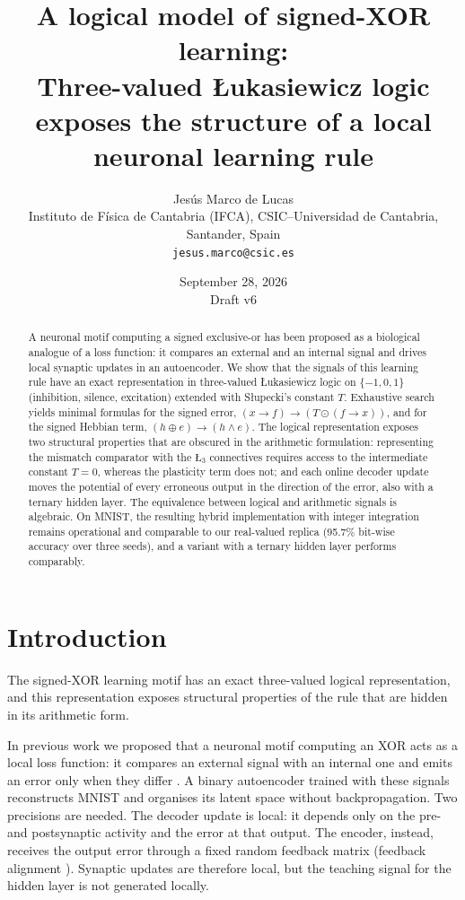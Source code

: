 \documentclass[11pt,a4paper]{article}
\title{A logical model of signed-XOR learning:\\[4pt]
\large Three-valued \L ukasiewicz logic exposes the structure of a local neuronal learning rule}
\author{Jes\'us Marco de Lucas\\[2pt]
\small Instituto de F\'isica de Cantabria (IFCA), CSIC--Universidad de Cantabria, Santander, Spain\\
\small \texttt{jesus.marco@csic.es}}
\date{September 28, 2026 \\ \small Draft v6}
\theoremstyle{remark}
\newcommand{\Lt}{\text{\L}_3}
\begin{document}
\maketitle

\begin{abstract}
A neuronal motif computing a signed exclusive-or has been proposed as a biological analogue of a loss function: it compares an external and an internal signal and drives local synaptic updates in an autoencoder. We show that the signals of this learning rule have an exact representation in three-valued \L ukasiewicz logic on $\{-1,0,1\}$ (inhibition, silence, excitation) extended with S\l upecki's constant $T$. Exhaustive search yields minimal formulas for the signed error, $(x\to f)\to(T\odot(f\to x))$, and for the signed Hebbian term, $(h\oplus e)\to(h\wedge e)$. The logical representation exposes two structural properties that are obscured in the arithmetic formulation: representing the mismatch comparator with the $\Lt$ connectives requires access to the intermediate constant $T=0$, whereas the plasticity term does not; and each online decoder update moves the potential of every erroneous output in the direction of the error, also with a ternary hidden layer. The equivalence between logical and arithmetic signals is algebraic. On MNIST, the resulting hybrid implementation with integer integration remains operational and comparable to our real-valued replica (95.7\% bit-wise accuracy over three seeds), and a variant with a ternary hidden layer performs comparably.
\end{abstract}

\section{Introduction}

The signed-XOR learning motif has an exact three-valued logical representation, and this representation exposes structural properties of the rule that are hidden in its arithmetic form.

In previous work we proposed that a neuronal motif computing an XOR acts as a local loss function: it compares an external signal with an internal one and emits an error only when they differ \cite{pena2024,pena2026}. A binary autoencoder trained with these signals reconstructs MNIST and organises its latent space without backpropagation. Two precisions are needed. The decoder update is local: it depends only on the pre- and postsynaptic activity and the error at that output. The encoder, instead, receives the output error through a fixed random feedback matrix (feedback alignment \cite{lillicrap2016}). Synaptic updates are therefore local, but the teaching signal for the hidden layer is not generated locally.
\end{document}
